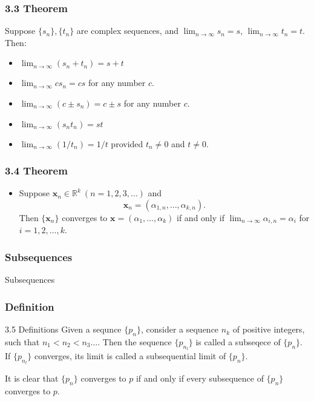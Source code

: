 \documentclass{beamer}
\begin{document}
\begin{frame}
    \frametitle{3.3 Theorem}

    Suppose \(\{s_n\},\{t_n\}\) are complex sequences, and \(\lim_{n\to \infty}s_n =s\), \(
    \lim_{n \to \infty}t_n =t\). Then: \pause 
    \begin{itemize}
        \item \(\lim_{n \to \infty} (s_n + t_n)=s +t\) \pause
        \item \(\lim_{n \to \infty} cs_n= cs\) for any number \(c\). \pause
        \item \(\lim_{n \to \infty} (c\pm s_n)= c \pm s\) for any number \(c\). \pause
        \item \(\lim_{n \to \infty} (s_n t_n) = st\) \pause
        \item \(\lim_{n \to \infty} (1/t_n) = 1/t\) provided \(t_n \ne 0\) and \(t \neq 0\).
    \end{itemize}

\end{frame}

\begin{frame}
    \frametitle{3.4 Theorem}

    \begin{itemize}
        \item Suppose \(\mathbf{x}_n \in \mathbb{R}^k~(n=1,2,3, \dots)\) and \[\mathbf{x}_n = (\alpha_{1,n}, \dots, \alpha_{k,n}).\] Then \(\{\mathbf{x}_n\}\) converges to \(\mathbf{x} = (\alpha_1, \dots, \alpha_k)\) if and only if \(\lim_{n \to \infty}\alpha_{i,n} = \alpha_i\) for \(i=1,2,\dots,k\). 
    \end{itemize}

\end{frame}

\begin{frame}
    \frametitle{Subsequences}

    \Huge{Subsequences}

\end{frame}

\begin{frame}
    \frametitle{Definition}

    \begin{block}{3.5 Definitions}
        Given a sequnce \(\{p_n\}\), consider a sequence \(n_k\) of positive integers, such that \(n_1 <n_2< n_3 \dots \). Then the sequence \(\{p_{n_l}\}\) is called a subseqece of \(\{p_n\}\). If \(\{p_{n_l}\}\)  converges, its limit is called a subsequential limit of \(\{p_n\}\). 
    \end{block}\pause

    It is clear that \(\{p_n\}\) converges to \(p\) if and only if every subsequence of \(\{p_n\}\) converges to \(p\). 
    

\end{frame}
\end{document}
